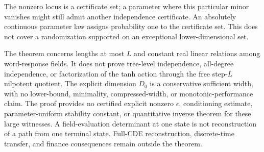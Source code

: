 \documentclass[11pt,a4paper]{article}
\numberwithin{equation}{section}
\theoremstyle{definition}
\theoremstyle{remark}
\begin{document}
The nonzero locus is a certificate set; a parameter where this particular
minor vanishes might still admit another independence certificate.
An absolutely continuous parameter law assigns probability one to the
certificate set. This does not cover a randomization supported on an
exceptional lower-dimensional set.

The theorem concerns lengths at most $L$ and constant real linear
relations among word-response fields. It does not prove tree-level
independence, all-degree independence, or factorization of the tanh
action through the free step-$L$ nilpotent quotient. The explicit
dimension $D_0$ is a conservative sufficient width, with no lower-bound,
minimality, compressed-width, or monotonic-performance claim. The proof
provides no certified explicit nonzero $\epsilon$, conditioning estimate,
parameter-uniform stability constant, or quantitative inverse theorem
for these large witnesses. A field-evaluation determinant at one state
is not reconstruction of a path from one terminal state. Full-CDE
reconstruction, discrete-time transfer, and finance consequences remain
outside the theorem.
\end{document}
